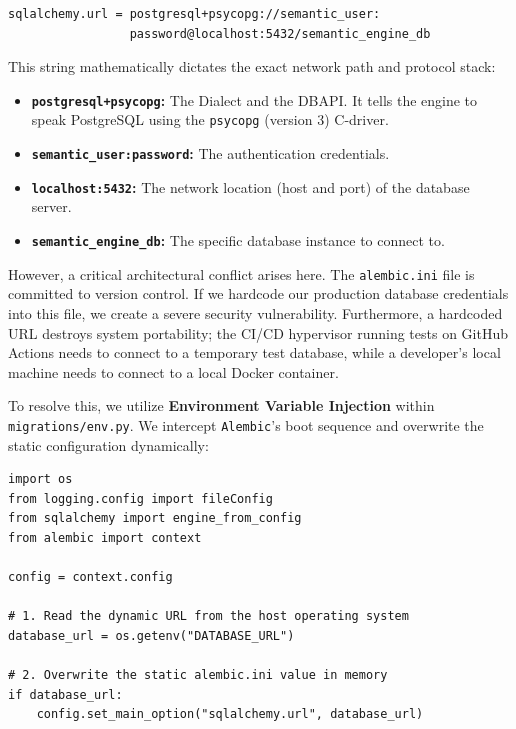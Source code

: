 \begin{lstlisting}[caption={The Database Connection String}]
sqlalchemy.url = postgresql+psycopg://semantic_user:
                 password@localhost:5432/semantic_engine_db
\end{lstlisting}

This string mathematically dictates the exact network path and protocol stack:
\begin{itemize}
    \item \textbf{\texttt{postgresql+psycopg}:} The Dialect and the DBAPI. It tells the engine to speak PostgreSQL using the \texttt{psycopg} (version 3) C-driver.
    \item \textbf{\texttt{semantic\_user:password}:} The authentication credentials.
    \item \textbf{\texttt{localhost:5432}:} The network location (host and port) of the database server.
    \item \textbf{\texttt{semantic\_engine\_db}:} The specific database instance to connect to.
\end{itemize}

However, a critical architectural conflict arises here. The \texttt{alembic.ini} file is committed to version control. If we hardcode our production database credentials into this file, we create a severe security vulnerability. Furthermore, a hardcoded URL destroys system portability; the CI/CD hypervisor running tests on GitHub Actions needs to connect to a temporary test database, while a developer's local machine needs to connect to a local Docker container.

To resolve this, we utilize \textbf{Environment Variable Injection} within \texttt{migrations/env.py}. We intercept \texttt{Alembic}'s boot sequence and overwrite the static configuration dynamically:

\begin{lstlisting}[caption={Dynamic URL Injection in \texttt{env.py}}]
import os
from logging.config import fileConfig
from sqlalchemy import engine_from_config
from alembic import context

config = context.config

# 1. Read the dynamic URL from the host operating system
database_url = os.getenv("DATABASE_URL")

# 2. Overwrite the static alembic.ini value in memory
if database_url:
    config.set_main_option("sqlalchemy.url", database_url)
\end{lstlisting}

